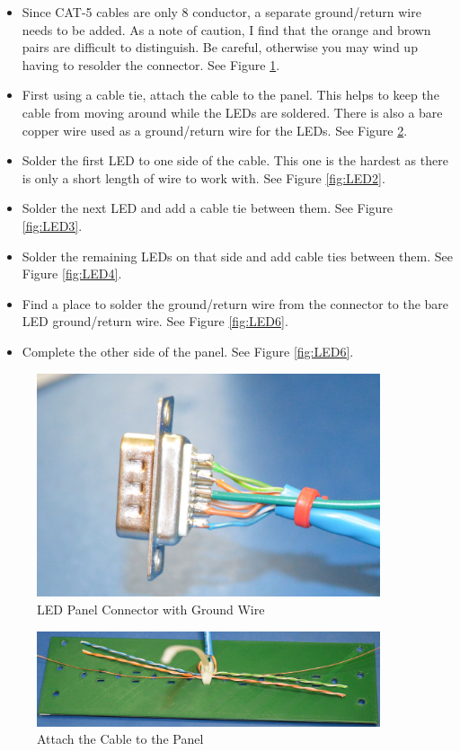 \documentclass[10pt, openany]{book}
\begin{document}
\begin{itemize}
  \item Since CAT-5 cables are only 8 conductor, a separate ground/return wire needs to be added.  As a note of caution, I find that the orange and brown pairs are difficult to distinguish.  Be careful, otherwise you may wind up having to resolder the connector.  See Figure \ref{fig:LED5}.
  \item First using a cable tie, attach the cable to the panel.  This helps to keep the cable from moving around while the LEDs are soldered.  There is also a bare copper wire used as a ground/return wire for the LEDs.  See Figure \ref{fig:LED1}.
  \item Solder the first LED to one side of the cable.  This one is the hardest as there is only a short length of wire to work with.  See Figure \ref{fig:LED2}.
  \item Solder the next LED and add a cable tie between them.  See Figure \ref{fig:LED3}.
  \item Solder the remaining LEDs on that side and add cable ties between them.  See Figure \ref{fig:LED4}.
  \item Find a place to solder the ground/return wire from the connector to the bare LED ground/return wire.  See Figure \ref{fig:LED6}.
  \item Complete the other side of the panel.  See Figure \ref{fig:LED6}.
\end{itemize}

\begin{figure}[ht!]
  \centering
  \includegraphics[width=0.9\textwidth]{../Pict/LEDs5.jpg}
  \caption{LED Panel Connector with Ground Wire}
  \label{fig:LED5}
\end{figure}

\begin{figure}[ht!]
  \centering
  \includegraphics[width=0.9\textwidth]{../Pict/LEDs1.jpg}
  \caption{Attach the Cable to the Panel}
  \label{fig:LED1}
\end{figure}
\end{document}
